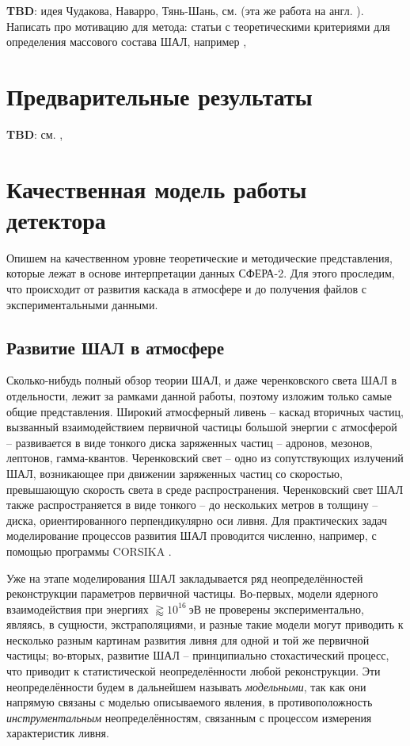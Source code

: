 \documentclass[12pt]{book}
\begin{document}
	\textbf{TBD}: идея Чудакова, Наварро, Тянь-Шань, см. \cite{chernov2015-overview} (эта же работа на англ. \cite{Sphere2015}). Написать про мотивацию для метода: статьи с теоретическими критериями для определения массового состава ШАЛ, например \cite{Anokhina2007}, \cite{Chernov2017-ICRC}
	
	\section{Предварительные результаты}
	
	\textbf{TBD}: см. \cite{Antonov2013}, 

	\section{Качественная модель работы детектора}
	
	Опишем на качественном уровне теоретические и методические представления, которые лежат в основе интерпретации данных СФЕРА-2. Для этого проследим, что происходит от развития каскада в атмосфере и до получения файлов с экспериментальными данными.

	\subsection{Развитие ШАЛ в атмосфере}
		
	Сколько-нибудь полный обзор теории ШАЛ, и даже черенковского света ШАЛ в отдельности, лежит за рамками данной работы, поэтому изложим только самые общие представления. Широкий атмосферный ливень -- каскад вторичных частиц, вызванный взаимодействием первичной частицы большой энергии с атмосферой -- развивается в виде тонкого диска заряженных частиц -- адронов, мезонов, лептонов, гамма-квантов. Черенковский свет -- одно из сопутствующих излучений ШАЛ, возникающее при движении заряженных частиц со скоростью, превышающую скорость света в среде распространения. Черенковский свет ШАЛ также распространяется в виде тонкого -- до нескольких метров в толщину -- диска, ориентированного перпендикулярно оси ливня. Для практических задач моделирование процессов развития ШАЛ проводится численно, например, с помощью программы CORSIKA \cite{CORSIKA-report}.
	
	Уже на этапе моделирования ШАЛ закладывается ряд неопределённостей реконструкции параметров первичной частицы. Во-первых, модели ядерного взаимодействия при энергиях $\gtrapprox 10^{16}~\text{эВ}$ не проверены экспериментально, являясь, в сущности, экстраполяциями, и разные такие модели могут приводить к несколько разным картинам развития ливня для одной и той же первичной частицы; во-вторых, развитие ШАЛ -- принципиально стохастический процесс, что приводит к статистической неопределённости любой реконструкции. Эти неопределённости будем в дальнейшем называть \textit{модельными}, так как они напрямую связаны с моделью описываемого явления, в противоположность \textit{инструментальным} неопределённостям, связанным с процессом измерения характеристик ливня.
	
\end{document}
